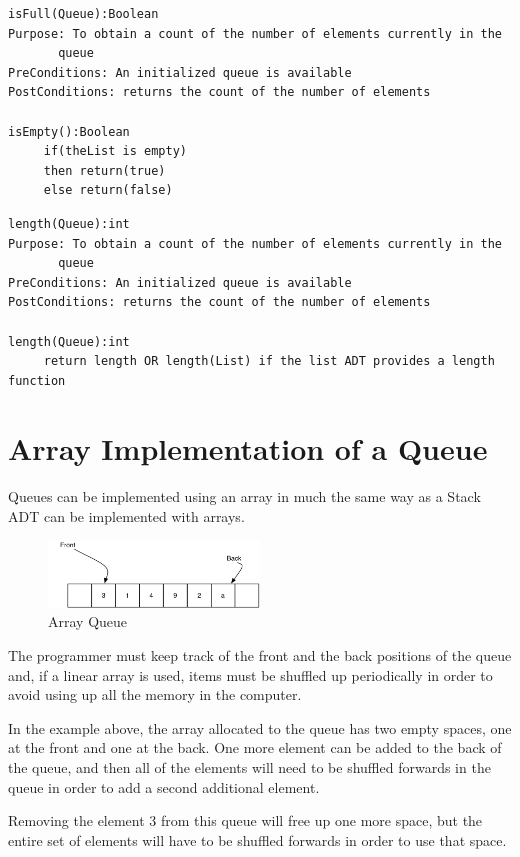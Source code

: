   


\begin{lstlisting}
isFull(Queue):Boolean
Purpose: To obtain a count of the number of elements currently in the 
       queue
PreConditions: An initialized queue is available
PostConditions: returns the count of the number of elements

isEmpty():Boolean
     if(theList is empty)
     then return(true)
     else return(false)
\end{lstlisting}




\begin{lstlisting}
length(Queue):int
Purpose: To obtain a count of the number of elements currently in the 
       queue
PreConditions: An initialized queue is available
PostConditions: returns the count of the number of elements

length(Queue):int
     return length OR length(List) if the list ADT provides a length function
\end{lstlisting}

\section{Array Implementation of a Queue}
Queues can be implemented using an array in much the same way as a Stack ADT can be implemented with arrays.

\begin{figure}[H]
\centering
\includegraphics[width=0.5\textwidth]{pictures/arrayBasedQueue.jpg}
\caption{Array Queue}
\label{fig:arrayQueue}
\end{figure}

The programmer must keep track of the front and the back positions of the queue and, if a linear array is used, items must be shuffled up periodically in order to avoid using up all the memory in the computer.

In the example above, the array allocated to the queue has two empty spaces, one at the front and one at the back. One more element can be added to the back of the queue, and then all of the elements will need to be shuffled forwards in the queue in order to add a second additional element.

Removing the element 3 from this queue will free up one more space, but the entire set of elements will have to be shuffled forwards in order to use that space.


